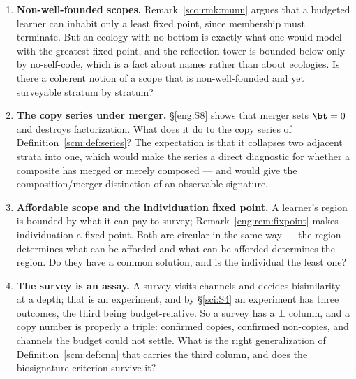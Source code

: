 \begin{enumerate}[label=\textbf{Gap \arabic*.}, leftmargin=*, itemsep=8pt]
  \item \textbf{Non-well-founded scopes.}
        Remark~\ref{sco:rmk:munu} argues that a budgeted learner can
        inhabit only a least fixed point, since membership must
        terminate.
        But an ecology with no bottom is exactly what one would model
        with the greatest fixed point, and the reflection tower is
        bounded below only by no-self-code, which is a fact about
        names rather than about ecologies.
        Is there a coherent notion of a scope that is
        non-well-founded and yet surveyable stratum by stratum?

  \item \textbf{The copy series under merger.}
        \S\ref{eng:S8} shows that merger sets $\bt = 0$ and destroys
        factorization.
        What does it do to the copy series of
        Definition~\ref{scm:def:series}?
        The expectation is that it collapses two adjacent strata into
        one, which would make the series a direct diagnostic for
        whether a composite has merged or merely composed --- and
        would give the composition/merger distinction of \chComp an
        observable signature.

  \item \textbf{Affordable scope and the individuation fixed point.}
        A learner's region is bounded by what it can pay to survey;
        Remark~\ref{eng:rem:fixpoint} makes individuation a fixed
        point.
        Both are circular in the same way --- the region determines
        what can be afforded and what can be afforded determines the
        region.
        Do they have a common solution, and is the individual the
        least one?

  \item \textbf{The survey is an assay.}
        A survey visits channels and decides bisimilarity at a depth;
        that is an experiment, and by \S\ref{sci:S4} an experiment has
        three outcomes, the third being budget-relative.
        So a survey has a $\bot$ column, and a copy number is properly
        a triple: confirmed copies, confirmed non-copies, and channels
        the budget could not settle.
        What is the right generalization of
        Definition~\ref{scm:def:cnn} that carries the third column,
        and does the biosignature criterion survive it?

\end{enumerate}

